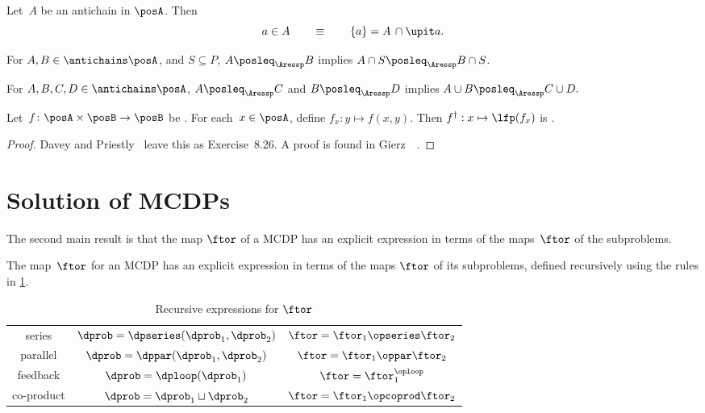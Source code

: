 \begin{lemma}
  \label{lem:antichain-write}Let~$A$ be an antichain in $\posA$.
  Then
  \[
    a\in A\qquad\equiv\qquad\{a\}=A\,\cap\upit a.
  \]
\end{lemma}

\begin{lemma}
  \label{lem:antichain_inter}For $A,B\in\antichains\posA$, and $S\subseteq P$,
  $A\posleq_{\Aressp}B$ implies $A\cap S\posleq_{\Aressp}B\cap S$.
\end{lemma}

\begin{lemma}
  \label{lem:antichain_union}For $A,B,C,D\in\antichains\posA$, $A\posleq_{\Aressp}C$
  and $B\posleq_{\Aressp}D$ implies $A\cup B\posleq_{\Aressp}C\cup D.$
\end{lemma}

\begin{lemma}
  \label{lem:dagger}Let~$f\colon\posA\times\posB\rightarrow\posB$
  be \scottcontinuous. For each~$x\in\posA$, define $f_{x}:y\mapsto f(x,y).$
  Then $f^{\dagger}:x\mapsto\lfp(f_{x})$ is \scottcontinuous.
\end{lemma}
\begin{proof}
  Davey and Priestly~\cite{davey02} leave this as Exercise~8.26.
  A proof is found in Gierz~\etal~\cite[Exercise II-2.29]{gierz03continuous}.
\end{proof}

\section{Solution of MCDPs}
\label{sec:Solution-of-Monotone}

The second main result is that the map $\ftor$ of a MCDP has an explicit
expression in terms of the maps~$\ftor$ of the subproblems.

\noindent

\begin{theorem}
  \label{thm:CDP-solvig}The map~$\ftor$ for an MCDP has an explicit
  expression in terms of the maps $\ftor$ of its subproblems, defined
  recursively using the rules in \cref{tab:Correspondence}.
\end{theorem}

\begin{table}[h]
  \begin{centering}
    \caption{Recursive expressions for $\ftor$\label{tab:Correspondence}}
  \end{centering}
  \centering{}\setlength\extrarowheight{5pt}\normalsize
  \begin{tabular}{ccc}
    series & $\dprob=\dpseries(\dprob_{1},\dprob_{2})$ & $\ftor=\ftor_{1}\opseries\ftor_{2}$\tabularnewline
    parallel & $\dprob=\dppar(\dprob_{1},\dprob_{2})$ & $\ftor=\ftor_{1}\oppar\ftor_{2}$\tabularnewline
    feedback & $\dprob=\dploop(\dprob_{1})$ & $\ftor=\ftor_{1}^{\oploop}$\tabularnewline
    co-product & $\dprob=\dprob_{1}\sqcup\dprob_{2}$ & $\ftor=\ftor_{1}\opcoprod\ftor_{2}$\tabularnewline
  \end{tabular}
\end{table}

